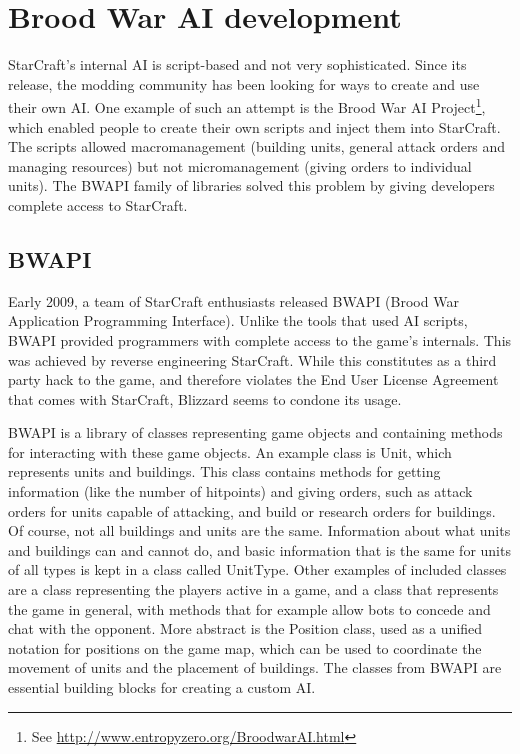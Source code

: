 
\chapter{Brood War AI development}
\label{chap:libraries}

StarCraft's internal AI is script-based and not very sophisticated. Since its release, the modding community has been looking for ways to create and use their own AI. One example of such an attempt is the Brood War AI Project\footnote{See \url{http://www.entropyzero.org/BroodwarAI.html}}, which enabled people to create their own scripts and inject them into StarCraft. The scripts allowed macromanagement (building units, general attack orders and managing resources) but not micromanagement (giving orders to individual units). The BWAPI family of libraries solved this problem by giving developers complete access to StarCraft.

\section{BWAPI}
\label{sec:bwapi}

Early 2009, a team of StarCraft enthusiasts released BWAPI (Brood War Application Programming Interface). Unlike the tools that used AI scripts, BWAPI provided programmers with complete access to the game's internals. This was achieved by reverse engineering StarCraft. While this constitutes as a third party hack to the game, and therefore violates the End User License Agreement that comes with StarCraft, Blizzard seems to condone its usage.

BWAPI is a library of classes representing game objects and containing methods for interacting with these game objects. An example class is Unit, which represents units and buildings. This class contains methods for getting information (like the number of hitpoints) and giving orders, such as attack orders for units capable of attacking, and build or research orders for buildings. Of course, not all buildings and units are the same. Information about what units and buildings can and cannot do, and basic information that is the same for units of all types is kept in a class called UnitType. Other examples of included classes are a class representing the players active in a game, and a class that represents the game in general, with methods that for example allow bots to concede and chat with the opponent. More abstract is the Position class, used as a unified notation for positions on the game map, which can be used to coordinate the movement of units and the placement of buildings. The classes from BWAPI are essential building blocks for creating a custom AI.

